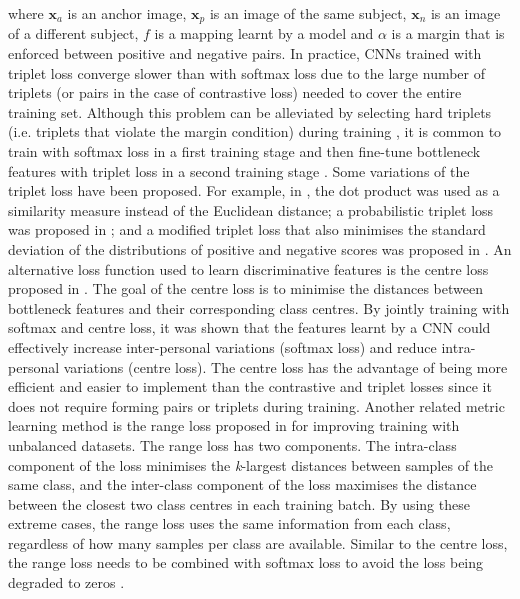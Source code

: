\documentclass[conference]{IEEEtran}
\begin{document}
where $\bm{x}_a$ is an anchor image, $\bm{x}_p$ is an image of the same subject, $\bm{x}_n$ is an image of a different subject, $f$ is a mapping learnt by a model and $\alpha$ is a margin that is enforced between positive and negative pairs. In practice, CNNs trained with triplet loss converge slower than with softmax loss due to the large number of triplets (or pairs in the case of contrastive loss) needed to cover the entire training set. Although this problem can be alleviated by selecting hard triplets (i.e. triplets that violate the margin condition) during training \cite{schroff2015facenet}, it is common to train with softmax loss in a first training stage and then fine-tune bottleneck features with triplet loss in a second training stage \cite{parkhi2015deep,sankaranarayanan2016triplet,sankaranarayanan2016triplet2}. Some variations of the triplet loss have been proposed. For example, in \cite{sankaranarayanan2016triplet}, the dot product was used as a similarity measure instead of the Euclidean distance; a probabilistic triplet loss was proposed in \cite{sankaranarayanan2016triplet2}; and a modified triplet loss that also minimises the standard deviation of the distributions of positive and negative scores was proposed in \cite{kumar2016learning,trigueros2018enhancing}. An alternative loss function used to learn discriminative features is the centre loss proposed in \cite{wen2016discriminative}. The goal of the centre loss is to minimise the distances between bottleneck features and their corresponding class centres. By jointly training with softmax and centre loss, it was shown that the features learnt by a CNN could effectively increase inter-personal variations (softmax loss) and reduce intra-personal variations (centre loss). The centre loss has the advantage of being more efficient and easier to implement than the contrastive and triplet losses since it does not require forming pairs or triplets during training. Another related metric learning method is the range loss proposed in \cite{zhang2016range} for improving training with unbalanced datasets. The range loss has two components. The intra-class component of the loss minimises the \textit{k}-largest distances between samples of the same class, and the inter-class component of the loss maximises the distance between the closest two class centres in each training batch. By using these extreme cases, the range loss uses the same information from each class, regardless of how many samples per class are available. Similar to the centre loss, the range loss needs to be combined with softmax loss to avoid the loss being degraded to zeros \cite{wen2016discriminative}.
\end{document}
